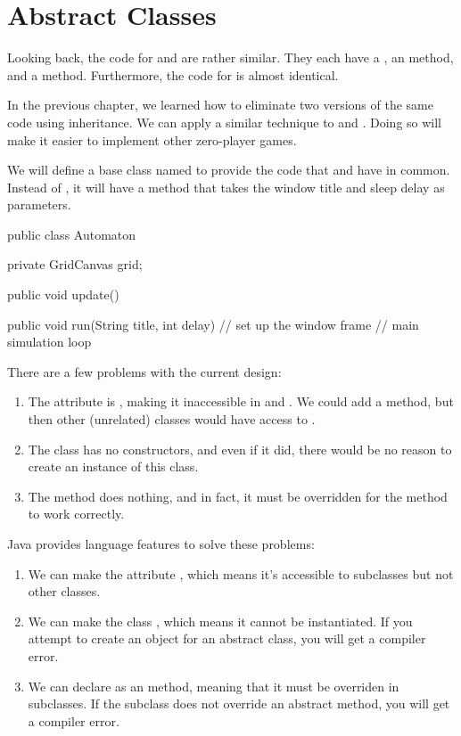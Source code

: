 \section{Abstract Classes}

Looking back, the code for  and  are rather similar.
They each have a , an  method, and a  method.
Furthermore, the code for  is almost identical.

In the previous chapter, we learned how to eliminate two versions of the same code using inheritance.
We can apply a similar technique to  and .
Doing so will make it easier to implement other zero-player games.

We will define a base class named  to provide the code that  and  have in common.
Instead of , it will have a  method that takes the window title and sleep delay as parameters.

\begin{code}
public class Automaton {
    private GridCanvas grid;

    public void update() {
    }

    public void run(String title, int delay) {
        // set up the window frame
        // main simulation loop
    }
}
\end{code}

There are a few problems with the current design:
\begin{enumerate}
\item The  attribute is , making it inaccessible in  and .
We could add a  method, but then other (unrelated) classes would have access to .
\item The  class has no constructors, and even if it did, there would be no reason to create an instance of this class.
\item The  method does nothing, and in fact, it must be overridden for the  method to work correctly.
\end{enumerate}


Java provides language features to solve these problems:
\begin{enumerate}
\item We can make the  attribute , which means it's accessible to subclasses but not other classes.
\item We can make the class , which means it cannot be instantiated.
If you attempt to create an object for an abstract class, you will get a compiler error.
\item We can declare  as an  method, meaning that it must be overriden in subclasses.
If the subclass does not override an abstract method, you will get a compiler error.
\end{enumerate}

